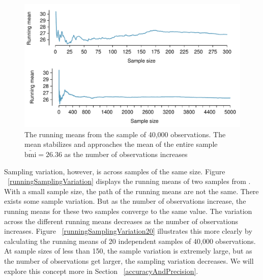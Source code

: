 \begin{figure}
   \centering
   \includegraphics[width=\textwidth]{ch_inference_foundations_oi_biostat/figures/brfssBMIRunningMean/brfssBMIRunningMean}
   \caption{The running means from the  sample of 40,000 observations. The mean stabilizes and approaches the mean of the entire sample $\bar{\mathrm{bmi}} = 26.36$ as the number of observations increases}
      \label{BMIRunningMean}
\end{figure}

Sampling variation, however, is across samples of the same size. Figure ~\ref{runningSamplingVariation} displays the running means of two samples from . With a small sample size, the path of the running means are not the same. There exists some sample variation. But as the number of observations increase, the running means for these two samples converge to the same value. The variation across the different running means decreases as the number of observations increases. Figure ~\ref{runningSamplingVariation20} illustrates this more clearly by calculating the running means of 20 independent samples of 40,000 observations. At sample sizes of less than 150, the sample variation is extremely large, but as the number of observations get larger, the sampling variation decreases. We will explore this concept more in Section ~\ref{accuracyAndPrecision}. 

